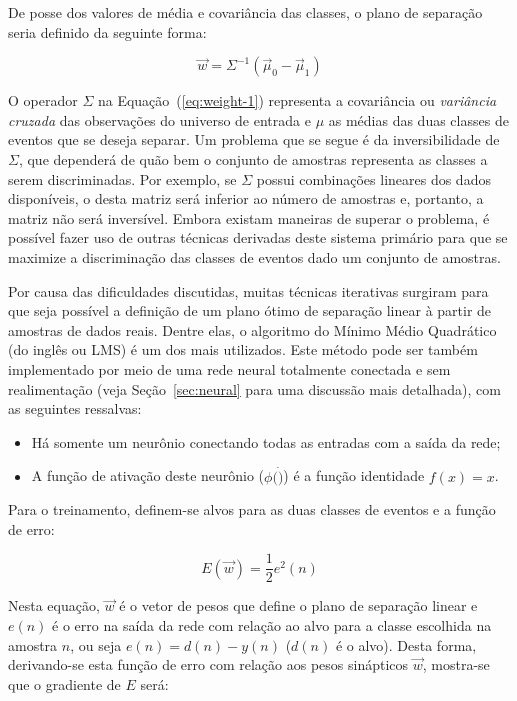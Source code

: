 De posse dos valores de média e covariância das classes, o plano de separação
seria definido da seguinte forma:

\begin{equation}
\overrightarrow{w} = \Sigma^{-1}(\overrightarrow{\mu}_0 -
\overrightarrow{\mu}_1) 
\label{eq:weight-1}
\end{equation}

O operador $\Sigma$ na Equação~(\ref{eq:weight-1}) representa a covariância ou
\textit{variância cruzada} das observações do universo de entrada e $\mu$ as
médias das duas classes de eventos que se deseja separar. Um problema que se
segue é da inversibilidade de $\Sigma$, que dependerá de quão bem o conjunto
de amostras representa as classes a serem discriminadas. Por exemplo, se
$\Sigma$ possui combinações lineares dos dados disponíveis, o  desta
matriz será inferior ao número de amostras e, portanto, a matriz não será
inversível. Embora existam maneiras de superar o problema, é possível fazer
uso de outras técnicas derivadas deste sistema primário para que se maximize a
discriminação das classes de eventos dado um conjunto de amostras.

Por causa das dificuldades discutidas, muitas técnicas iterativas surgiram
para que seja possível a definição de um plano ótimo de separação linear à
partir de amostras de dados reais. Dentre elas, o algoritmo do Mínimo Médio
Quadrático \cite{widrow} (do inglês  ou LMS) é um dos
mais utilizados. Este método pode ser também implementado por meio de uma rede
neural totalmente conectada e sem realimentação (veja Seção~\ref{sec:neural}
para uma discussão mais detalhada), com as seguintes ressalvas:

\begin{itemize}
\item Há somente um neurônio conectando todas as entradas com a saída da rede;
\item A função de ativação deste neurônio ($\phi(\dot)$) é a função identidade
$f(x) = x$.
\end{itemize}

Para o treinamento, definem-se alvos para as duas classes de eventos e a
função de erro:

\begin{equation}
E(\overrightarrow{w}) = \frac{1}{2} e^2(n)
\label{eq:mse-definition}
\end{equation}

Nesta equação, $\overrightarrow{w}$ é o vetor de pesos que define o plano de
separação linear e $e(n)$ é o erro na saída da rede com relação ao alvo para a
classe escolhida na amostra $n$, ou seja $e(n) = d(n)-y(n)$ ($d(n)$ é o
alvo). Desta forma, derivando-se esta função de erro com relação aos pesos
sinápticos $\overrightarrow{w}$, mostra-se que o gradiente de $E$ será:

